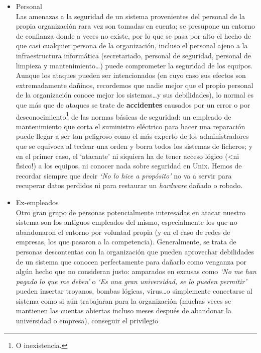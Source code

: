 \begin{itemize}
\item Personal\\
Las amenazas a la seguridad de un sistema provenientes del personal de la
propia organizaci\'on rara vez son tomadas en cuenta;
se presupone un entorno de confianza donde a veces no existe, por lo que se
pasa por alto el hecho de que casi cualquier persona de la organizaci\'on, 
incluso el personal ajeno a la infraestructura inform\'atica (secretariado,
personal de seguridad, personal de limpieza y mantenimiento\ldots) puede 
comprometer la seguridad de los equipos.\\
Aunque los ataques pueden ser intencionados (en cuyo caso sus efectos son
extremadamente da\~ninos, recordemos que nadie mejor que el propio personal
de la organizaci\'on conoce mejor los sistemas\ldots y sus debilidades), lo
normal es que m\'as que de ataques se trate de {\bf accidentes} causados por
un error o por desconocimiento\footnote{O inexistencia.} de las normas 
b\'asicas de seguridad: un empleado de mantenimiento que corta el suministro
el\'ectrico para hacer una reparaci\'on puede llegar a ser tan peligroso como
el m\'as experto de los administradores que se equivoca al teclear una orden y
borra todos los sistemas de ficheros; y en el primer caso, el `atacante' ni
siquiera ha de tener acceso l\'ogico (<ni f\'{\i}sico!) a los equipos, ni 
conocer nada sobre seguridad en Unix. Hemos de recordar siempre que decir 
{\it `No lo hice a prop\'osito'} no va a servir para recuperar datos perdidos
ni para restaurar un {\it hardware} da\~nado o robado.
\item Ex-empleados\\
Otro gran grupo de personas potencialmente interesadas en atacar nuestro
sistema son los antiguos empleados del mismo, especialmente los que no 
abandonaron el entorno por voluntad propia (y en el caso de redes de empresas,
los que pasaron a la competencia).
Generalmente, se trata de personas descontentas con la organizaci\'on que 
pueden aprovechar debilidades de un sistema que conocen perfectamente para
da\~narlo como venganza por alg\'un hecho que no consideran justo: amparados
en excusas como {\it `No me han pagado lo que me deben'} o {\it `Es una gran
universidad, se lo pueden permitir'} pueden insertar troyanos, bombas l\'ogicas,
virus\ldots o simplemente conectarse al sistema como si a\'un trabajaran para la
organizaci\'on (muchas veces se mantienen las cuentas abiertas incluso meses
despu\'es de abandonar la universidad o empresa), conseguir el privilegio 

\end{itemize}
